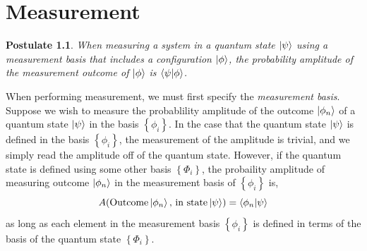 \documentclass{book}
\newtheorem{postulate}{\textbf{Postulate}}
\begin{document}
\chapter{Measurement}
\begin{postulate}
	When measuring a system in a quantum state $\ket{\psi}$ using a measurement basis that includes a configuration $\ket{\phi}$, the probability amplitude of the measurement outcome of $\ket{\phi}$ is $\braket{\psi}{\phi}$.
\end{postulate}\noindent
When performing measurement, we must first specify the \textit{measurement basis}. Suppose we wish to measure the probablility amplitude of the outcome $\ket{\phi_n}$ of a quantum state $\ket{\psi}$ in the basis $\left\{\phi_i\right\}$. In the case that the quantum state $\ket{\psi}$ is defined in the basis $\left\{\phi_i\right\}$, the measurement of the amplitude is trivial, and we simply read the amplitude off of the quantum state. However, if the quantum state is defined using some other basis $\left\{\Phi_i\right\}$, the probaility amplitude of measuring outcome $\ket{\phi_n}$ in the measurement basis of $\left\{\phi_i\right\}$ is,
\begin{equation}
	A(\text{Outcome} \ket{\phi_n} \text{, in state} \ket{\psi}) = \braket{\phi_n}{\psi}
\end{equation}
as long as each element in the measurement basis $\left\{\phi_i\right\}$ is defined in terms of the basis of the quantum state $\left\{\Phi_i\right\}$.
\end{document}
